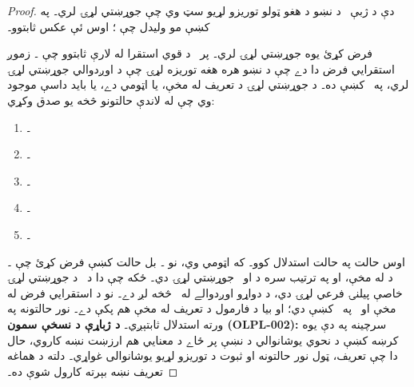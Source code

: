 \documentclass[12pt,a4paper,oneside]{report}
\newcommand{\olfileid}[3]{\gdef\pspart{#1}\gdef\pschapter{#2}\gdef\pssection{#3}}
\gdef\pspart{#2}\gdef\pschapter{#3}\gdef\pssection{}%
\theoremstyle{definition}
\begin{document}
\label{olpseg:OLP-0060-B015:start}
\begin{proof}
 دې د ژبې~ د نښو د هغو ټولو توريزو لړيو سټ وي چې
جوړښتي لړۍ لري۔ په  کښې مو وليدل
چې ؛ اوس ئې عکس ثابتوو۔
\label{olpseg:OLP-0060-B015:end}

\label{olpseg:OLP-0060-B016:start}
فرض کړئ  يوه جوړښتي لړۍ  لري۔ پر~
د قوي استقرا له لارې ثابتوو چې ۔ زموږ استقرايي
فرض دا دے چې د نښو هره هغه توريزه لړۍ چې د  اوږدوالي
جوړښتي لړۍ لري، په~\LR{$\Frm[L_0]$} کښې ده۔ د جوړښتي لړۍ د تعريف له مخې،
يا  اټومي دے، يا بايد داسې  موجود وي چې له لاندې
حالتونو څخه يو صدق وکړي:
\begin{enumerate}
    \item {}۔%
    \item {}۔%
    \item {}۔%
    \item {}۔%
    \item {}۔%
\end{enumerate}
اوس حالت په حالت استدلال کوو۔ که  اټومي وي، نو
۔ بل حالت کښې فرض کړئ چې ۔ د  له مخې،
 او  په ترتيب
سره د  او~ جوړښتي لړۍ دي۔ ځکه چې دا د~ د جوړښتي
لړۍ خاصې پيلنۍ فرعي لړۍ دي، د دواړو اوږدوالے له~ څخه لږ دے۔ نو
د استقرايي فرض له مخې  او~ په~\LR{$\Frm[L_0]$} کښې دي؛ او
بيا د فارمول د تعريف له مخې  هم پکې دے۔
نور حالتونه په ورته استدلال ثابتېږي۔
\textbf{د ژباړې د نسخې سمون (OLPL-002):} سرچينه په دې يوه کرښه کښې
د نحوي يوشانوالي د نښې پر ځاے د معنايي هم ارزښت نښه کاروي، حال دا
چې تعريف، ټول نور حالتونه او ثبوت د توريزو لړيو يوشانوالی غواړي۔
دلته د هماغه تعريف نښه بېرته کارول شوې ده۔
\end{proof}
\label{olpseg:OLP-0060-B016:end}

\label{olpseg:OLP-0061-B004:start}
\olfileid{pl}{syn}{val}
\label{olpseg:OLP-0061-B004:end}

\label{olpseg:OLP-0061-B005:start}
\label{olpseg:OLP-0061-B005:end}
\end{document}
